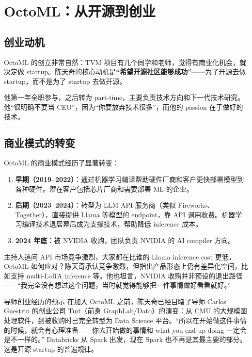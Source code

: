 \section{OctoML：从开源到创业}

\subsection{创业动机}

OctoML 的创立非常自然：TVM 项目有几个同学和老师，觉得有商业化机会，就决定做 startup。陈天奇的核心动机是\textbf{``希望开源社区能够成功''}------为了开源去做 startup，而不是为了 startup 去做开源。

他第一年全职参与，之后转为 part-time，主要负责技术方向和下一代技术研究。他``很明确不要当 CEO''，因为``你要放弃技术很多''，而他的 passion 在于做好的技术。

\subsection{商业模式的转变}

OctoML 的商业模式经历了显著转变：

\begin{enumerate}
    \item \textbf{早期（2019--2022）}：通过机器学习编译帮助硬件厂商和客户更快部署模型到各种硬件。潜在客户包括芯片厂商和需要部署 ML 的企业。
    \item \textbf{后期（2023--2024）}：转型为 LLM API 服务商（类似 Fireworks、Together），直接提供 Llama 等模型的 endpoint，靠 API 调用收费。机器学习编译技术退居幕后成为支撑技术，帮助降低 inference 成本。
    \item \textbf{2024 年底}：被 NVIDIA 收购，团队负责 NVIDIA 的 AI compiler 方向。
\end{enumerate}

主持人追问 API 市场竞争激烈，大家都在比谁的 Llama inference cost 更低，OctoML 如何应对？陈天奇承认竞争激烈，但指出产品形态上仍有差异化空间，比如支持 multi-LoRA inference 等。他也坦言，NVIDIA 收购并非预设的退出路径------``我完全没有想过这个问题，当时就觉得能够把一件事情做好看看就好。''

\begin{knowledgebox}{导师创业经历的预示}
在加入 OctoML 之前，陈天奇已经目睹了导师 Carlos Guestrin 的创业公司 Turi（前身 GraphLab/Dato）的演变：从 CMU 的大规模图处理软件，到被收购时已完全转型为 Data Science 平台。``所以在开始做这件事情的时候，就会有心理准备------你去开始做的事情和 what you end up doing 一定会是不一样的。'' Databricks 从 Spark 出发，现在 Spark 也不再是其最主要的部分。这是开源 startup 的普遍规律。
\end{knowledgebox}

